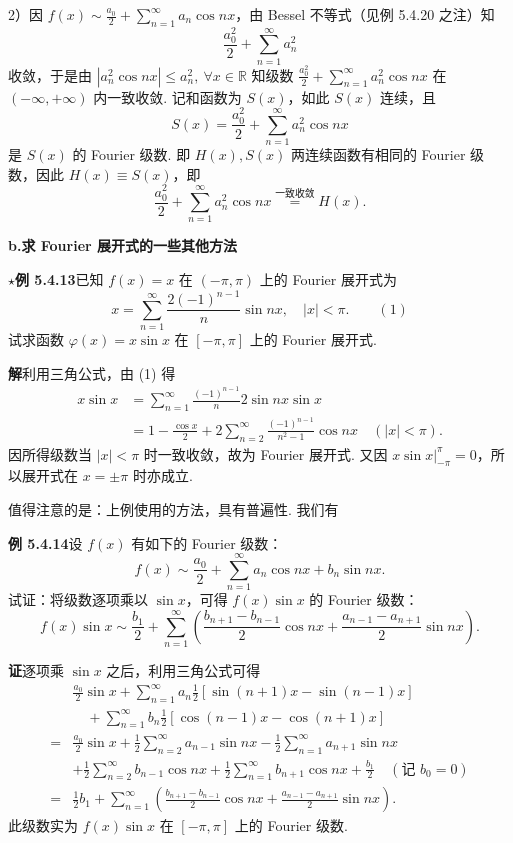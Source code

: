 \documentclass[UTF8,12pt,a4paper,fontset=fandol]{ctexart}
\providecommand{\xlongequal}[1]{\stackrel{#1}{=}}
\begin{document}
2）因 $\displaystyle f(x)\sim\frac{a_0}{2}+\sum_{n=1}^{\infty}a_n\cos nx$，由 Bessel 不等式（见例 5.4.20 之注）知
\[
  \frac{a_0^2}{2}+\sum_{n=1}^{\infty}a_n^2
\]
收敛，于是由 $|a_n^2\cos nx|\le a_n^2,\ \forall x\in\mathbb R$ 知级数
$\displaystyle\frac{a_0^2}{2}+\sum_{n=1}^{\infty}a_n^2\cos nx$ 在 $(-\infty,+\infty)$ 内一致收敛.
记和函数为 $S(x)$，如此 $S(x)$ 连续，且
\[
  S(x)=\frac{a_0^2}{2}+\sum_{n=1}^{\infty}a_n^2\cos nx
\]
是 $S(x)$ 的 Fourier 级数. 即 $H(x),S(x)$ 两连续函数有相同的 Fourier 级数，因此
$H(x)\equiv S(x)$，即
\[
  \frac{a_0^2}{2}+\sum_{n=1}^{\infty}a_n^2\cos nx
  \xlongequal{\text{一致收敛}}H(x).
\]

\noindent\textbf{b.\quad 求 Fourier 展开式的一些其他方法}

\noindent\(\star\)\textbf{例 5.4.13}\quad 已知 $f(x)=x$ 在 $(-\pi,\pi)$ 上的 Fourier 展开式为
\[
  x=\sum_{n=1}^{\infty}\frac{2(-1)^{n-1}}{n}\sin nx,\quad |x|<\pi. \qquad(1)
\]
试求函数 $\varphi(x)=x\sin x$ 在 $[-\pi,\pi]$ 上的 Fourier 展开式.

\noindent\textbf{解}\quad 利用三角公式，由 (1) 得
\[
\begin{aligned}
x\sin x
&=\sum_{n=1}^{\infty}\frac{(-1)^{n-1}}{n}2\sin nx\sin x\\
&=1-\frac{\cos x}{2}+2\sum_{n=2}^{\infty}\frac{(-1)^{n-1}}{n^2-1}\cos nx\quad(|x|<\pi).
\end{aligned}
\]
因所得级数当 $|x|<\pi$ 时一致收敛，故为 Fourier 展开式. 又因
$x\sin x\big|_{-\pi}^{\pi}=0$，所以展开式在 $x=\pm\pi$ 时亦成立.

值得注意的是：上例使用的方法，具有普遍性. 我们有

\noindent\textbf{例 5.4.14}\quad 设 $f(x)$ 有如下的 Fourier 级数：
\[
  f(x)\sim\frac{a_0}{2}+\sum_{n=1}^{\infty}a_n\cos nx+b_n\sin nx.
\]
试证：将级数逐项乘以 $\sin x$，可得 $f(x)\sin x$ 的 Fourier 级数：
\[
  f(x)\sin x\sim\frac{b_1}{2}
  +\sum_{n=1}^{\infty}\left(\frac{b_{n+1}-b_{n-1}}2\cos nx
  +\frac{a_{n-1}-a_{n+1}}2\sin nx\right).
\]

\noindent\textbf{证}\quad 逐项乘 $\sin x$ 之后，利用三角公式可得
\[
\begin{aligned}
&\frac{a_0}{2}\sin x+\sum_{n=1}^{\infty}a_n\frac12[\sin(n+1)x-\sin(n-1)x]\\
&\quad+\sum_{n=1}^{\infty}b_n\frac12[\cos(n-1)x-\cos(n+1)x]\\
={}&\frac{a_0}{2}\sin x+\frac12\sum_{n=2}^{\infty}a_{n-1}\sin nx
-\frac12\sum_{n=1}^{\infty}a_{n+1}\sin nx\\
&+\frac12\sum_{n=2}^{\infty}b_{n-1}\cos nx
+\frac12\sum_{n=1}^{\infty}b_{n+1}\cos nx+\frac{b_1}{2}\quad(\text{记 }b_0=0)\\
={}&\frac12b_1+\sum_{n=1}^{\infty}\left(\frac{b_{n+1}-b_{n-1}}2\cos nx
+\frac{a_{n-1}-a_{n+1}}2\sin nx\right).
\end{aligned}
\]
此级数实为 $f(x)\sin x$ 在 $[-\pi,\pi]$ 上的 Fourier 级数.
\end{document}
